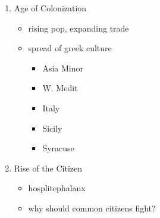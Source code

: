 \documentclass[11pt, a4paper]{article}
\begin{document}
\begin{itemize}
\begin{enumerate}
\begin{itemize}
        \end{itemize}
      \item Age of Colonization
        \begin{itemize}
          \item rising pop, expanding trade
          \item spread of greek culture
            \begin{itemize}
              \item Asia Minor
              \item W. Medit
              \item Italy
              \item Sicily
              \item Syracuse
            \end{itemize}
        \end{itemize}
      \item Rise of the Citizen
        \begin{itemize}
          \item hosplitephalanx
          \item why should common citizens fight?
        \end{itemize}
    \end{enumerate}
\end{itemize}
\end{document}
